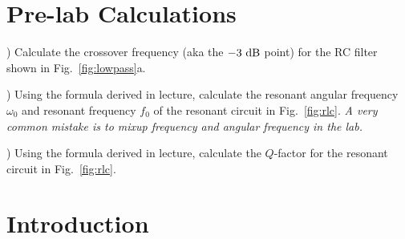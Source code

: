 \section{Pre-lab Calculations}

) Calculate the crossover frequency (aka the $-3~\rm dB$ point) for the RC filter shown in Fig.~\ref{fig:lowpass}a. \\ \vskip 0.25cm

) Using the formula derived in lecture, calculate the resonant angular frequency $\omega_0$ and resonant frequency $f_0$ of the resonant circuit in Fig.~\ref{fig:rlc}.  {\em A very common mistake is to mixup frequency and angular frequency in the lab.} \\ \vskip 0.25cm

) Using the formula derived in lecture, calculate the $Q$-factor for the resonant circuit in Fig.~\ref{fig:rlc}.

\section{Introduction}


